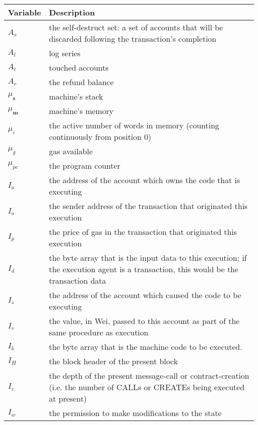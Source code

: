\documentclass{article}
\begin{document}
\begin{tabular}{l|p{10cm}}
\textbf{Variable} & \textbf{Description} \\
\hline
\hline
$A_s$ & the self-destruct set: a set of accounts that will be discarded following the transaction’s completion \\
$A_l$ & log series \\
$A_t$ & touched accounts \\
$A_r$ & the refund balance \\
$\mu_\mathbf{s}$ & machine’s stack \\
$\mu_\mathbf{m}$ & machine’s memory \\
$\mu_i$ & the active number of words in memory (counting continuously from position 0)\\
$\mu_g$ & gas available\\
$\mu_{pc}$ & the program counter\\
$I_a$ & the address of the account which owns the code that is executing \\
$I_o$ & the sender address of the transaction that originated this execution \\
$I_p$ & the price of gas in the transaction that originated this execution \\
$I_d$ & the byte array that is the input data to this execution; if the execution agent is a transaction, this would be the transaction data \\
$I_s$ & the address of the account which caused the code to be executing \\
$I_v$ & the value, in Wei, passed to this account as part of the same procedure as execution \\
$I_b$ & the byte array that is the machine code to be executed. \\
$I_H$ & the block header of the present block \\
$I_e$ & the depth of the present message-call or contract-creation (i.e. the number of CALLs or CREATEs being executed at present)\\
$I_w$ & the permission to make modifications to the state\\
\end{tabular}


\newpage
\end{document}
